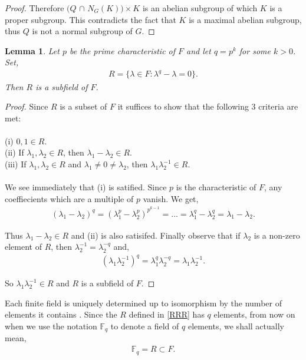 \documentclass[a4paper , 11pt]{book}
\newtheorem{lemma}[theorem]{Lemma}
\theoremstyle{definition}
\theoremstyle{remark}
\begin{document}
\begin{proof}
Therefore $(Q$ $\cap$ $N_G(K)) \times K$ is an abelian subgroup of which $K$ is a proper subgroup. This contradicts the fact that $K$ is a maximal abelian subgroup, thus $Q$ is not a normal subgroup of $G$.

\end{proof}

\begin{lemma}\label{subfield} Let $p$ be the prime characteristic of $F$ and let $q= p^k$ for some $k>0$. Set,
\begin{align}\label{RRR} R = \{ \lambda \in F : \lambda^q -\lambda = 0 \}.
\end{align}
Then $R$ is a subfield of $F$.
\end{lemma}

\begin{proof} Since $R$ is a subset of $F$ it suffices to show that the following 3 criteria are met: \\
\\
(i) $0, 1 \in R$. \\
(ii) If $\lambda_1, \lambda_2 \in R$, then $\lambda_1 - \lambda_2 \in R$. \\
(iii) If $\lambda_1, \lambda_2 \in R$ and $\lambda_1 \neq 0 \neq \lambda_2$, then $\lambda_1 \lambda^{-1}_2 \in R$. \\
\\
We see immediately that (i) is satified. Since $p$ is the characteristic of $F$, any coeffiecients which are a multiple of $p$ vanish. We get,
\begin{align*} (\lambda_1 - \lambda_2)^q = (\lambda^p_1 - \lambda^p_2)^{p^{k-1}} = ... = \lambda^q_1 - \lambda^q_2 = \lambda_1 - \lambda_2.
\end{align*}

Thus $\lambda_1 - \lambda_2 \in R$ and (ii) is also satisifed. Finally observe that if $\lambda_2$ is a non-zero element of $R$, then $\lambda^{-1}_2 = \lambda^{-q}_2$ and,
\begin{align*} (\lambda_1 \lambda^{-1}_2)^q = \lambda^q_1 \lambda^{-q}_2 = \lambda_1 \lambda^{-1}_2.
\end{align*}

So $\lambda_1 \lambda^{-1}_2 \in R$ and $R$ is a subfield of $F$.

\end{proof}

Each finite field is uniquely determined up to isomorphism by the number of elements it contains \cite[p.227]{stewart}. Since the $R$ defined in \eqref{RRR} has $q$ elements, from now on when we use the notation $\mathbb{F}_q$ to denote a field of $q$ elements, we shall actually mean,
\begin{align}\label{subfield} \mathbb{F}_q = R \subset F.
\end{align}
\end{document}
